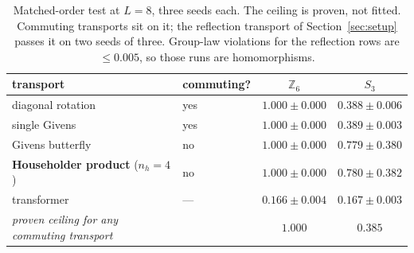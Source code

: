 \documentclass[10pt]{article}
\begin{document}
\begin{table}[H]\centering\small
\caption{Matched-order test at $L=8$, three seeds each. The ceiling is proven, not fitted. Commuting
transports sit on it; the reflection transport of Section~\ref{sec:setup} passes it on two seeds of
three. Group-law violations for the reflection rows are $\le0.005$, so those runs are homomorphisms.}
\begin{tabular}{llcc}
\toprule
transport & commuting? & $\mathbb{Z}_6$ & $S_3$ \\
\midrule
diagonal rotation & yes & $1.000\pm0.000$ & $0.388\pm0.006$ \\
single Givens     & yes & $1.000\pm0.000$ & $0.389\pm0.003$ \\
Givens butterfly  & no  & $1.000\pm0.000$ & $0.779\pm0.380$ \\
\textbf{Householder product} ($n_h=4$) & no & $\mathbf{1.000\pm0.000}$ & $\mathbf{0.780\pm0.382}$ \\
transformer       & --- & $0.166\pm0.004$ & $0.167\pm0.003$ \\
\midrule
\textit{proven ceiling for any commuting transport} & & $1.000$ & $\mathbf{0.385}$ \\
\bottomrule
\end{tabular}
\label{tab:ceiling}
\end{table}
\end{document}
